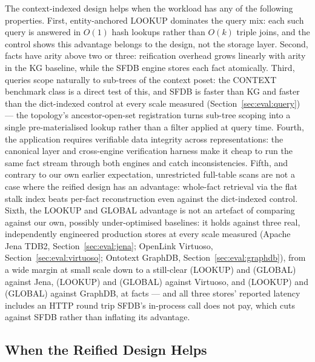The context-indexed design helps when the workload has any of the
following properties. First, entity-anchored LOOKUP dominates the query mix:
each such query is answered in $O(1)$ hash lookups rather than
$O(k)$ triple joins, and the control shows this advantage belongs to the
design, not the storage layer. Second, facts have arity above two or
three: reification
overhead grows linearly with arity in the KG baseline, while the SFDB engine
stores each fact atomically. Third, queries scope naturally to sub-trees of
the context poset: the CONTEXT benchmark class is a direct test of this,
and SFDB is \rangecontextkg{} faster than KG and \rangecontextkgmem{}
faster than the dict-indexed control at every scale measured
(Section~\ref{sec:eval:query}) --- the topology's ancestor-open-set
registration turns sub-tree scoping into a single pre-materialised lookup
rather than a filter applied at query time. Fourth, the application requires
verifiable data integrity across representations: the canonical layer and
cross-engine verification harness make it cheap to run the same fact
stream through both engines and catch inconsistencies. Fifth, and
contrary to our own earlier expectation, unrestricted full-table scans
are not a case where the reified design has an advantage: whole-fact
retrieval via the flat stalk index beats per-fact reconstruction even
against the dict-indexed control. Sixth, the LOOKUP and GLOBAL advantage
is not an artefact of comparing against our own, possibly
under-optimised baselines: it holds against three real, independently
engineered production stores at every scale measured (Apache Jena TDB2,
Section~\ref{sec:eval:jena}; OpenLink Virtuoso,
Section~\ref{sec:eval:virtuoso}; Ontotext GraphDB,
Section~\ref{sec:eval:graphdb}), from a wide margin at small scale down
to a still-clear \lookupjenalarge{} (LOOKUP) and \globaljenalarge{}
(GLOBAL) against Jena, \lookupvirtuosolarge{} (LOOKUP) and
\globalvirtuosolarge{} (GLOBAL) against Virtuoso, and
\lookupgraphdblarge{} (LOOKUP) and \globalgraphdblarge{} (GLOBAL)
against GraphDB, at \jenalargescale{}
facts --- and all three stores' reported latency includes an HTTP round
trip SFDB's in-process call does not pay, which cuts against SFDB rather
than inflating its advantage.

\subsection{When the Reified Design Helps}
\label{sec:discussion:kg-wins}

